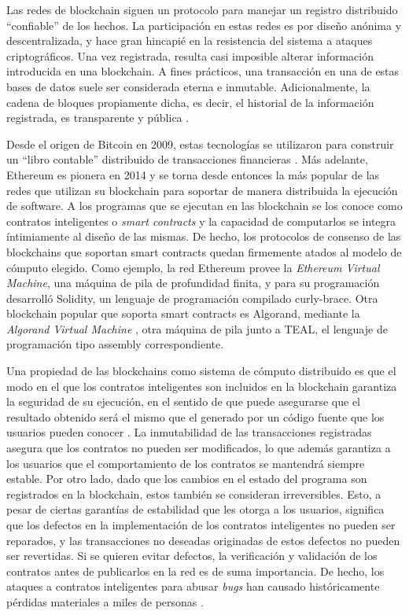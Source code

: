 Las redes de blockchain siguen un protocolo para manejar un registro distribuido ``confiable'' de los hechos.
La participación en estas redes es por diseño anónima y descentralizada, y hace gran hincapié en la resistencia del sistema a ataques criptográficos.
Una vez registrada, resulta casi imposible  alterar información introducida en una blockchain.
A fines prácticos, una transacción en una de estas bases de datos suele ser considerada eterna e inmutable.
Adicionalmente, la cadena de bloques propiamente dicha, es decir, el historial de la información registrada, es transparente y pública \cite{bitcoin-overview} \cite{survey-of-blockchain-security}.

Desde el origen de Bitcoin en 2009, estas tecnologías se utilizaron para construir un ``libro contable'' distribuido  de transacciones financieras \cite{survey-of-blockchain-security}.
Más adelante, Ethereum es pionera en 2014 \cite{ethereum-white-paper} y se torna desde entonces la más popular de las redes que utilizan su blockchain para soportar de manera distribuida la ejecución de software.
A los programas que se ejecutan en las blockchain se los conoce como contratos inteligentes o \textit{smart contracts} y la capacidad de computarlos se integra íntimiamente al diseño de las mismas.
De hecho, los protocolos de consenso de las blockchains que soportan smart contracts quedan firmemente atados al modelo de cómputo elegido.
Como ejemplo, la red Ethereum provee la \emph{Ethereum Virtual Machine}\cite{ethereum-yellow-paper}, una máquina de pila de profundidad finita, y para su programación desarrolló Solidity\cite{solidity}, un lenguaje de programación compilado curly-brace.
Otra blockchain popular que soporta smart contracts es Algorand, mediante la \textit{Algorand Virtual Machine} \cite{algorand-avm}, otra máquina de pila junto a TEAL, el lenguaje de programación tipo assembly correspondiente.

Una propiedad de las blockchains como sistema de cómputo distribuido es que el modo en el que los contratos inteligentes son incluidos en la blockchain garantiza la seguridad de su ejecución, en el sentido de que puede asegurarse que el resultado obtenido será el mismo que el generado por un código fuente que los usuarios pueden conocer \cite{survey-of-blockchain-security}.
La inmutabilidad de las transacciones registradas asegura que los contratos no pueden ser modificados, lo que además garantiza a los usuarios que el comportamiento de los contratos se mantendrá siempre estable.
Por otro lado, dado que los cambios en el estado del programa son registrados en la blockchain, estos también se consideran irreversibles.
Esto, a pesar de ciertas garantías de estabilidad que les otorga a los usuarios, significa que los defectos en la implementación de los contratos inteligentes no pueden ser reparados, y las transacciones no deseadas originadas de estos defectos no pueden ser revertidas.
Si se quieren evitar defectos, la verificación y validación de los contratos antes de publicarlos en la red es de suma importancia.
De hecho, los ataques a contratos inteligentes para abusar \textit{bugs} han causado históricamente pérdidas materiales a miles de personas \cite{DAO}.

